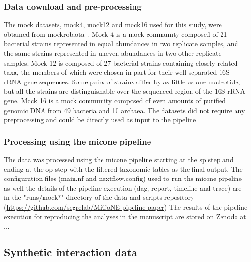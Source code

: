     \subsubsection*{Data download and pre-processing}
    The mock datasets, mock4, mock12 and mock16 used for this study, were obtained from mockrobiota~\cite{Bokulich2016}.
    Mock 4 is a mock community composed of 21 bacterial strains represented in equal abundances in two replicate samples, and the same strains represented in uneven abundances in two other replicate samples.
    Mock 12 is composed of 27 bacterial strains containing closely related taxa, the members of which were chosen in part for their well-separated 16S rRNA gene sequences. Some pairs of strains differ by as little as one nucleotide, but all the strains are distinguishable over the sequenced region of the 16S rRNA gene.
    Mock 16 is a mock community composed of even amounts of purified genomic DNA from 49 bacteria and 10 archaea.
    The datasets did not require any preprocessing and could be directly used as input to the pipeline

    \subsubsection*{Processing using the \ac{micone} pipeline}
    The data was processed using the \ac{micone} pipeline starting at the \ac{sp} step and ending at the \ac{op} step with the filtered taxonomic tables as the final output.
    The configuration files (main.nf and nextflow.config) used to run the \ac{micone} pipeline as well the details of the pipeline execution (dag, report, timeline and trace) are in the "runs/mock*" directory of the data and scripts repository (\href{https://github.com/segrelab/MiCoNE-pipeline-paper}{https://github.com/segrelab/MiCoNE-pipeline-paper})
    The results of the pipeline execution for reproducing the analyses in the manuscript are stored on Zenodo at ...

  \subsection*{Synthetic interaction data}

